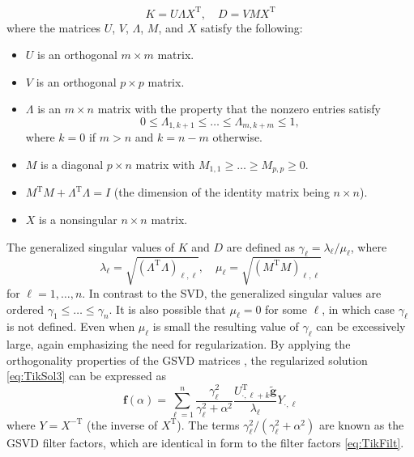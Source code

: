 \documentclass[12pt]{article}
\newcommand{\gnoiseVec}{\widetilde{\mathbf{g}}}	%
\newcommand{\kMat}{K}	%
\newcommand{\fVec}{\mathbf{f}}	%
\newcommand{\trans}{\mathrm{T}}	%
\newcommand{\regparam}{\alpha}
\begin{document}
\begin{equation}
\label{eq:GSVD matrices}
\kMat = U\Lambda X^\trans, \quad D = VMX^\trans
\end{equation}
where the matrices $U$, $V$, $\Lambda$, $M$, and $X$ satisfy the following: 
\begin{itemize}
\item $U$ is an orthogonal $m \times m$ matrix. 
\item $V$ is an orthogonal $p \times p$ matrix.
\item $\Lambda$ is an $m \times n$ matrix with the property that the nonzero entries satisfy
\[0 \leq \Lambda_{1,k+1} \leq \ldots \leq \Lambda_{m,k+m} \leq 1,\]
where $k = 0$ if $m > n$ and $k = n-m$ otherwise. 
\item $M$ is a diagonal $p \times n$ matrix with $M_{1,1} \geq \ldots \geq M_{p,p} \geq 0.$
\item $M^\trans M + \Lambda^\trans \Lambda = I$ (the dimension of the identity matrix being $n \times n$).
\item $X$ is a nonsingular $n \times n$ matrix.
\end{itemize}
The generalized singular values of $\kMat$ and $D$ are defined as $\gamma_\ell = \lambda_{\ell}/\mu_{\ell}$, where
\begin{equation}
\label{eq:GSVD lambda}
\lambda_\ell = \sqrt{(\Lambda^\trans \Lambda)_{\ell,\ell}}, \quad \mu_\ell = \sqrt{(M^\trans M)_{\ell,\ell}}
\end{equation}
for $\ell = 1,\ldots,n$. In contrast to the SVD, the generalized singular values are ordered $\gamma_1 \leq \ldots \leq \gamma_n$. It is also possible that $\mu_\ell = 0$ for some $\ell$, in which case $\gamma_\ell$ is not defined. Even when $\mu_\ell$ is small the resulting value of $\gamma_\ell$ can be excessively large, again emphasizing the need for regularization. By applying the orthogonality properties of the GSVD matrices \cite[p.~105-106]{ABT}, the regularized solution \eqref{eq:TikSol3} can be expressed as
\begin{equation}
\label{eq:TikSol GSVD}
\fVec(\regparam) = \sum_{\ell=1}^n \frac{\gamma_\ell^2}{\gamma_\ell^2 + \regparam^2} \frac{U_{\cdot,\ell+k}^\trans\gnoiseVec}{\lambda_\ell}Y_{\cdot,\ell}
\end{equation}
where $Y = X^{-\trans}$ (the inverse of $X^\trans$). The terms $\gamma_\ell^2/(\gamma_\ell^2 + \regparam^2)$ are known as the GSVD filter factors, which are identical in form to the filter factors \eqref{eq:TikFilt}. \par 
\end{document}
